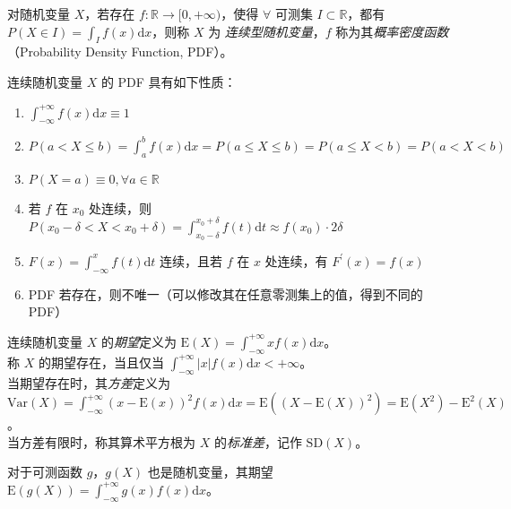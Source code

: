 \documentclass[../main.tex]{subfiles}
\begin{document}
\begin{definition}\label{def:2.4.1}
    对随机变量 $X$，若存在 $f:\mathbb{R}\rightarrow[0,+\infty)$，使得 $\forall$ 可测集 $I\subset\mathbb{R}$，都有 $P(X\in I)=\int_If(x)\mathrm{d}x$，则称 $X$ 为 \emph{连续型随机变量}，$f$ 称为其\emph{概率密度函数}（Probability Density Function, PDF）。
\end{definition}

\begin{proposition}
    连续随机变量 $X$ 的 PDF 具有如下性质：
    \begin{enumerate}
        \item $\int_{-\infty}^{+\infty}f(x)\mathrm{d}x\equiv 1$
        \item $P(a<X\leq b)=\int_a^bf(x)\mathrm{d}x=P(a\leq X\leq b)=P(a\leq X<b)=P(a<X<b)$
        \item $P(X=a)\equiv0,\forall a\in\mathbb{R}$
        \item 若 $f$ 在 $x_0$ 处连续，则 $P(x_0-\delta<X<x_0+\delta)=\int_{x_0-\delta}^{x_0+\delta}f(t)\mathrm{d}t\approx f(x_0)\cdot2\delta$
        \item $F(x)=\int_{-\infty}^xf(t)\mathrm{d}t$ 连续，且若 $f$ 在 $x$ 处连续，有 $F^\prime(x)=f(x)$
        \item PDF 若存在，则不唯一（可以修改其在任意零测集上的值，得到不同的 PDF）
    \end{enumerate}
\end{proposition}

\begin{definition}\label{def:2.4.2}
    \mbox{}
    连续随机变量 $X$ 的\emph{期望}定义为 $\mathrm{E}(X)=\int_{-\infty}^{+\infty}xf(x)\mathrm{d}x$。\\
    称 $X$ 的期望存在，当且仅当 $\int_{-\infty}^{+\infty}|x|f(x)\mathrm{d}x<+\infty$。\\
    当期望存在时，其\emph{方差}定义为 $\mathrm{Var}(X)=\int_{-\infty}^{+\infty}(x-\mathrm{E}(x))^2f(x)\mathrm{d}x=\mathrm{E}((X-\mathrm{E}(X))^2)=\mathrm{E}(X^2)-\mathrm{E}^2(X)$。\\
    当方差有限时，称其算术平方根为 $X$ 的\emph{标准差}，记作 $\mathrm{SD}(X)$。
\end{definition}

对于可测函数 $g$，$g(X)$ 也是随机变量，其期望 $\mathrm{E}(g(X))=\int_{-\infty}^{+\infty}g(x)f(x)\mathrm{d}x$。
\end{document}
